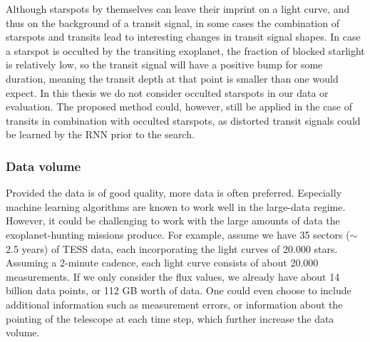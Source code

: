 Although starspots by themselves can leave their imprint on a light curve, and thus on the background of a transit signal, in some cases the combination of starspots and transits lead to interesting changes in transit signal shapes. In case a starspot is occulted by the transiting exoplanet, the fraction of blocked starlight is relatively low, so the transit signal will have a positive bump for some duration, meaning the transit depth at that point is smaller than one would expect. In this thesis we do not consider occulted starspots in our data or evaluation. The proposed method could, however, still be applied in the case of transits in combination with occulted starspots, as distorted transit signals could be learned by the RNN prior to the search.

\subsubsection{Data volume}

Provided the data is of good quality, more data is often preferred. Especially machine learning algorithms are known to work well in the large-data regime. However, it could be challenging to work with the large amounts of data the exoplanet-hunting missions produce. For example, assume we have 35 sectors ($\sim$2.5 years) of TESS data, each incorporating the light curves of 20.000 stars. Assuming a 2-minute cadence, each light curve consists of about 20.000 measurements. If we only consider the flux values, we already have about 14 billion data points, or 112 GB worth of data. One could even choose to include additional information such as measurement errors, or information about the pointing of the telescope at each time step, which further increase the data volume.